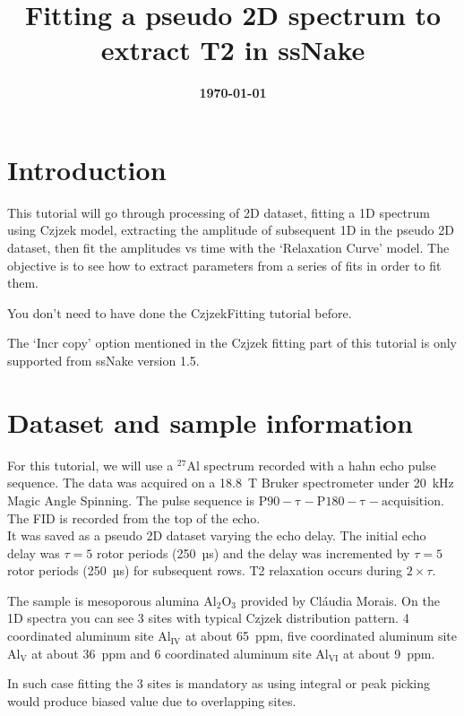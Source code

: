 \documentclass[11pt,a4paper]{article}
\title{\color{black}\fontfamily{SourceSansPro-LF}\bfseries Fitting a pseudo 2D spectrum to extract T2 in ssNake}
\author{}
\date{\color{black}\fontfamily{SourceSansPro-LF}\bfseries \today}
\begin{document}

\maketitle

\section{Introduction}
This tutorial will go through processing of 2D dataset, fitting a 1D spectrum using Czjzek model, extracting the amplitude of subsequent 1D
 in the pseudo 2D dataset, then fit the amplitudes vs time with the `Relaxation Curve' model. 
The objective is to see how to extract parameters from a series of fits in order to fit them.

You don't need to have done the CzjzekFitting tutorial before.

The `Incr copy' option mentioned in the Czjzek fitting part of this tutorial is only supported from ssNake version 1.5.

\section{Dataset and sample information}

For this tutorial, we will use a $\mathrm{{}^{27}Al}$ spectrum recorded with a hahn echo pulse sequence. 
The data was acquired on a 18.8~T Bruker spectrometer under 20~kHz Magic Angle Spinning.
The pulse sequence is $\mathrm{ P90 - \tau - P180 - \tau - acquisition}$.
The FID is recorded from the top of the echo. \\
It was saved as a pseudo 2D dataset varying the echo delay. The initial echo delay was $\tau=5$ rotor periods (250~µs)
and the delay was incremented by $\tau=5$ rotor periods (250~µs) for subsequent rows. T2 relaxation occurs during $2 \times \tau$.

The sample is mesoporous alumina $\mathrm{Al_2O_3}$ provided by Cláudia Morais. %
On the 1D spectra you can see 3 sites with typical Czjzek distribution pattern. 4 coordinated aluminum site $\mathrm{Al_{IV}}$ 
at about 65~ppm, five coordinated aluminum site $\mathrm{Al_{V}}$ at about 36~ppm and 6 coordinated aluminum site $\mathrm{Al_{VI}}$
at about 9~ppm.

In such case fitting the 3 sites is mandatory as using integral or peak picking would produce biased value due to overlapping sites.
\end{document}
